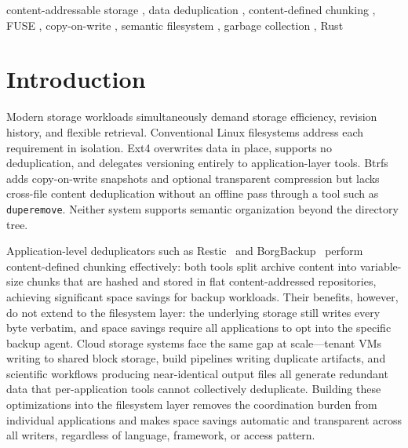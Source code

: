 \documentclass[5p,times]{elsarticle}
\begin{document}
\begin{frontmatter}
\begin{abstract}
ArcFS is evaluated against ext4, Btrfs, and a FUSE pass-through baseline
(bindfs) across responsive, durable, and integrity benchmark classes plus
a four-scenario disk-usage suite.  In the responsive class, ArcFS achieves
4,275\,MB/s sequential write throughput---9.2$\times$ over ext4---by
coalescing writes entirely in RAM.  On storage efficiency, ArcFS reduces
identical-file storage by 83.7\%, cuts mixed-workload consumption by 57.6\%
versus ext4, and holds snapshot costs within 1.3$\times$ of kernel Btrfs
CoW.  All CRC32c integrity verifications pass.  We characterize eleven
quantified limitations and discuss applicability to cloud storage
primitives: container image caches, build artifact stores, and scientific
data archives.
\end{abstract}

\begin{keyword}
content-addressable storage \sep
data deduplication \sep
content-defined chunking \sep
FUSE \sep
copy-on-write \sep
semantic filesystem \sep
garbage collection \sep
Rust
\end{keyword}

\end{frontmatter}

\section{Introduction}

Modern storage workloads simultaneously demand storage efficiency,
revision history, and flexible retrieval. Conventional Linux filesystems
address each requirement in isolation. Ext4 overwrites data in place,
supports no deduplication, and delegates versioning entirely to
application-layer tools. Btrfs adds copy-on-write snapshots and optional
transparent compression but lacks cross-file content deduplication
without an offline pass through a tool such as \texttt{duperemove}.
Neither system supports semantic organization beyond the directory tree.

Application-level deduplicators such as Restic~\cite{restic2024} and
BorgBackup~\cite{borgbackup2024} perform content-defined chunking
effectively: both tools split archive content into variable-size
chunks that are hashed and stored in flat content-addressed
repositories, achieving significant space savings for backup
workloads. Their benefits, however, do not extend to the filesystem
layer: the underlying storage still writes every byte verbatim, and
space savings require all applications to opt into the specific backup
agent. Cloud storage systems face the same gap at scale---tenant VMs
writing to shared block storage, build pipelines writing duplicate
artifacts, and scientific workflows producing near-identical output
files all generate redundant data that per-application tools cannot
collectively deduplicate. Building these optimizations into the
filesystem layer removes the coordination burden from individual
applications and makes space savings automatic and transparent across
all writers, regardless of language, framework, or access pattern.
\end{document}
